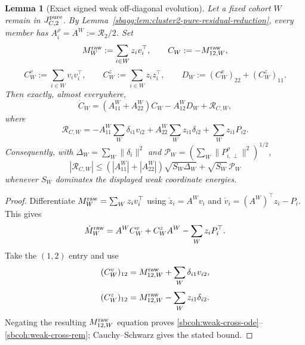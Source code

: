\documentclass{article} %
\theoremstyle{plain}
\newtheorem{lemma}[theorem]{Lemma}
\theoremstyle{definition}
\theoremstyle{remark}
\begin{document}
\begin{lemma}[Exact signed weak off-diagonal evolution]
\label{sbcoh:weak-cross}
Let a fixed cohort $W$ remain in $J_{C,2}^{\rm pure}$.  By
Lemma~\ref{sbagg:lem:cluster2-pure-residual-reduction}, every member has
$A_i^\rho=A^W:=\mathcal R_2/2$.  Set
\[
 M_W^{\rm raw}:=\sum_{i\in W}z_iv_i^\top,
 \qquad
 C_W:=-M_{12,W}^{\rm raw},
\]
\[
 C_W^v:=\sum_{i\in W}v_iv_i^\top,
 \qquad
 C_W^z:=\sum_{i\in W}z_iz_i^\top,
 \qquad
 D_W:=(C_W^v)_{22}+(C_W^z)_{11}.
\]
Then exactly, almost everywhere,
\begin{equation}\label{sbcoh:weak-cross-ode}
 \boxed{
 \dot C_W
 =(A_{11}^W+A_{22}^W)C_W-A_{12}^W D_W+\mathcal R_{C,W},
 }
\end{equation}
where
\begin{equation}\label{sbcoh:weak-cross-rem}
 \mathcal R_{C,W}
 =-A_{11}^W\sum_W\delta_{i1}v_{i2}
 +A_{22}^W\sum_W z_{i1}\delta_{i2}
 +\sum_W z_{i1}P_{i2}.
\end{equation}
Consequently, with
$\Delta_W=\sum_W\|\delta_i\|^2$ and
$\mathcal P_W=(\sum_W\|P_{i,\perp}^\rho\|^2)^{1/2}$,
\begin{equation}\label{sbcoh:weak-cross-rem-bound}
 |\mathcal R_{C,W}|
 \le(|A_{11}^W|+|A_{22}^W|)\sqrt{S_W\Delta_W}
      +\sqrt{S_W}\,\mathcal P_W
\end{equation}
whenever $S_W$ dominates the displayed weak coordinate energies.
\end{lemma}

\begin{proof}
Differentiate
$M_W^{\rm raw}=\sum_W z_iv_i^\top$ using
$\dot z_i=A^Wv_i$ and
$\dot v_i=(A^W)^\top z_i-P_i$.  This gives
\[
 \dot M_W^{\rm raw}=A^W C_W^v+C_W^zA^W-\sum_Wz_iP_i^\top.
\]
Take the $(1,2)$ entry and use
\[
 (C_W^v)_{12}=M_{12,W}^{\rm raw}+\sum_W\delta_{i1}v_{i2},
\]
\[
 (C_W^z)_{12}=M_{12,W}^{\rm raw}-\sum_Wz_{i1}\delta_{i2}.
\]
Negating the resulting $M_{12,W}^{\rm raw}$ equation proves
\eqref{sbcoh:weak-cross-ode}--\eqref{sbcoh:weak-cross-rem}; Cauchy--Schwarz
gives the stated bound.
\end{proof}
\end{document}
